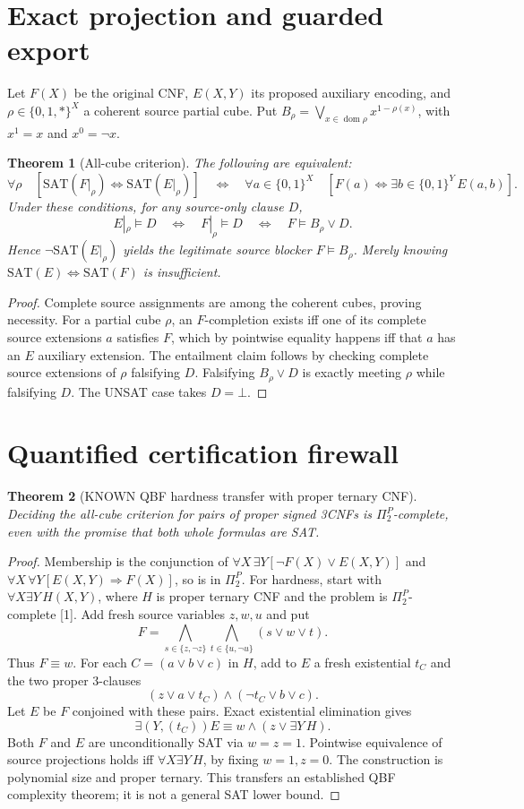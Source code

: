 \documentclass[11pt]{article}
\newtheorem{theorem}{Theorem}
\newcommand{\SAT}{\mathrm{SAT}}
\begin{document}
\section{Exact projection and guarded export}
Let $F(X)$ be the original CNF, $E(X,Y)$ its proposed auxiliary encoding, and $\rho\in\{0,1,*\}^{X}$ a coherent source partial cube. Put $B_\rho=\bigvee_{x\in\operatorname{dom}\rho}x^{1-\rho(x)}$, with $x^1=x$ and $x^0=\neg x$.
\begin{theorem}[All-cube criterion]
The following are equivalent:
\[
 \forall\rho\quad [\SAT(F|_\rho)\Leftrightarrow\SAT(E|_\rho)]
 \quad\Longleftrightarrow\quad
 \forall a\in\{0,1\}^X\quad[F(a)\Leftrightarrow\exists b\in\{0,1\}^Y\,E(a,b)].
\]
Under these conditions, for any source-only clause $D$,
\[
 E|_\rho\models D\quad\Longleftrightarrow\quad
 F|_\rho\models D\quad\Longleftrightarrow\quad
 F\models B_\rho\vee D.
\]
Hence $\neg\SAT(E|_\rho)$ yields the legitimate source blocker $F\models B_\rho$. Merely knowing $\SAT(E)\Leftrightarrow\SAT(F)$ is insufficient.
\end{theorem}
\begin{proof}
Complete source assignments are among the coherent cubes, proving necessity. For a partial cube $\rho$, an $F$-completion exists iff one of its complete source extensions $a$ satisfies $F$, which by pointwise equality happens iff that $a$ has an $E$ auxiliary extension. The entailment claim follows by checking complete source extensions of $\rho$ falsifying $D$. Falsifying $B_\rho\vee D$ is exactly meeting $\rho$ while falsifying $D$. The UNSAT case takes $D=\bot$.
\end{proof}
\section{Quantified certification firewall}
\begin{theorem}[KNOWN QBF hardness transfer with proper ternary CNF]
Deciding the all-cube criterion for pairs of proper signed 3CNFs is $\Pi_2^P$-complete, even with the promise that both whole formulas are SAT.
\end{theorem}
\begin{proof}
Membership is the conjunction of
$\forall X\,\exists Y[\neg F(X)\vee E(X,Y)]$
and $\forall X\,\forall Y[E(X,Y)\Rightarrow F(X)]$, so is in $\Pi_2^P$.
For hardness, start with $\forall X\exists Y\,H(X,Y)$, where $H$ is proper ternary CNF and the problem is $\Pi_2^P$-complete [1]. Add fresh source variables $z,w,u$ and put
\[
 F=\bigwedge_{s\in\{z,\neg z\}}\bigwedge_{t\in\{u,\neg u\}}(s\vee w\vee t).
\]
Thus $F\equiv w$. For each $C=(a\vee b\vee c)$ in $H$, add to $E$ a fresh existential $t_C$ and the two proper 3-clauses
\[
 (z\vee a\vee t_C)\wedge(\neg t_C\vee b\vee c).
\]
Let $E$ be $F$ conjoined with these pairs. Exact existential elimination gives
\[
 \exists(Y,(t_C))E\equiv w\wedge(z\vee\exists Y\,H).
\]
Both $F$ and $E$ are unconditionally SAT via $w=z=1$. Pointwise equivalence of source projections holds iff $\forall X\exists Y\,H$, by fixing $w=1,z=0$. The construction is polynomial size and proper ternary. This transfers an established QBF complexity theorem; it is not a general SAT lower bound.
\end{proof}
\end{document}

